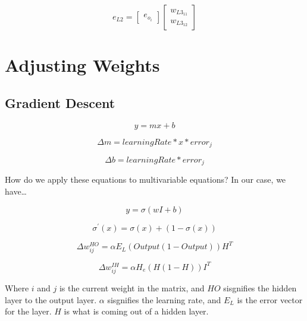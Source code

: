\documentclass{article}
\begin{document}
    \begin{equation}
        e_{L2} = 
        \begin{bmatrix}
            e_{o_i}
        \end{bmatrix}
        \begin{bmatrix}
            w_{L3_{11}} \\
            w_{L3_{12}}
        \end{bmatrix}
    \end{equation}

    \section{Adjusting Weights}
    \subsection{Gradient Descent}
    \begin{equation}
        y = mx+b
    \end{equation}

    \begin{equation}
        \Delta m = learningRate * x * error_j
    \end{equation}

    \begin{equation}
        \Delta b = learningRate * error_j
    \end{equation}

    How do we apply these equations to multivariable equations? In our case, we have\dots

    \begin{equation}
        y = \sigma (wI + b)
    \end{equation}

    \begin{equation}
        \sigma^{'}(x) = \sigma(x) + (1 - \sigma(x))
    \end{equation}

    \begin{equation}
        \Delta w^{HO}_{ij} = \alpha E_{L} (Output(1 - Output)) H^T 
    \end{equation}

    \begin{equation}
        \Delta w^{IH}_{ij} = \alpha H_e (H(1 - H)) I^T
    \end{equation}

    Where \(i\) and \(j\) is the current weight in the matrix, and \(HO\) 
    sisgnifies the hidden layer to the output layer. \(\alpha\) sisgnifies the 
    learning rate, and \(E_L\) is the error vector for the layer. \(H\) is what is 
    coming out of a hidden layer.
\end{document}
